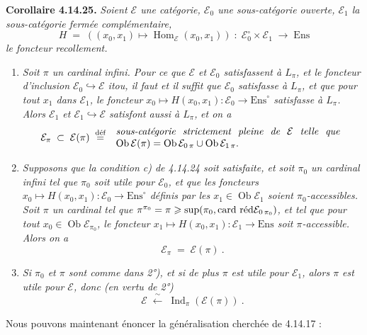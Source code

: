 \documentclass[11pt]{article}
\newcommand{\printedpage}[1]{\marginpar{\footnotesize p.~#1}}
\newcommand{\msp}[1]{\marginpar{\footnotesize [#1]}}
\newcommand{\cE}{\mathcal{E}}
\newcommand{\Ob}{\operatorname{Ob}}
\newcommand{\Hom}{\operatorname{Hom}}
\newcommand{\Ind}{\operatorname{Ind}}
\newcommand{\Ens}{\mathrm{Ens}}
\newcommand{\cardred}{\operatorname{card}\,\text{\upshape réd}}
\newcommand{\defeq}{\overset{\text{\upshape déf}}{=}}
\begin{document}
\textbf{Corollaire 4.14.25.} \textit{Soient $\cE$ une catégorie, $\cE_0$ une sous-catégorie ouverte, $\cE_1$ la sous-catégorie fermée complémentaire,}
\[
H \;=\; ((x_0,x_1) \longmapsto \Hom_{\cE}(x_0,x_1)) \;:\; \cE_0^\circ \times \cE_1 \;\longrightarrow\; \Ens
\]
\textit{le foncteur recollement.}
\begin{enumerate}
\item[\textit{1°)}] \textit{Soit $\pi$ un cardinal infini. Pour ce que $\cE$ et $\cE_0$ satisfassent à $L_\pi$, et le foncteur d'inclusion $\cE_0 \hookrightarrow \cE$ itou, il faut et il suffit que $\cE_0$ satisfasse à $L_\pi$, et que pour tout $x_1$ dans $\cE_1$, le foncteur $x_0 \longmapsto H(x_0,x_1) : \cE_0 \longrightarrow \Ens^\circ$ satisfasse à $L_\pi$. Alors $\cE_1$ et $\cE_1 \hookrightarrow \cE$ satisfont aussi à $L_\pi$,}
\msp{page 421}
\textit{et on a}
\[
\cE_\pi \;\subset\; \cE(\pi) \;\defeq\;
\begin{array}{l}
\text{\itshape sous-catégorie\ \ strictement\ \ pleine\ \ de\ \ $\cE$\ \ telle\ \ que}\\
\Ob\cE(\pi) = \Ob\cE_{0\,\pi} \cup \Ob\cE_{1\,\pi}.
\end{array}
\]
\item[\textit{2°)}] \textit{Supposons que la condition c) de 4.14.24 soit satisfaite, et soit $\pi_0$ un cardinal infini tel que $\pi_0$ soit utile pour $\cE_0$, et que les foncteurs $x_0 \longmapsto H(x_0,x_1) : \cE_0 \longrightarrow \Ens^\circ$ définis par les $x_1 \in \Ob\cE_1$ soient $\pi_0$-accessibles. Soit $\pi$ un cardinal tel que $\pi^{\pi_0} = \pi \geqslant \sup(\pi_0, \cardred\cE_{0\,\pi_0})$, et tel que pour tout $x_0 \in \Ob\cE_{\pi_0}$, le foncteur $x_1 \longmapsto H(x_0,x_1) : \cE_1 \longrightarrow \Ens$ soit $\pi$-accessible. Alors on a}
\[
\cE_\pi \;=\; \cE(\pi)\ .
\]

\printedpage{160}

\item[\textit{3°)}] \textit{Si $\pi_0$ et $\pi$ sont comme dans 2°), et si de plus $\pi$ est utile pour $\cE_1$, alors $\pi$ est utile pour $\cE$, donc (en vertu de 2°)}
\[
\cE \;\xleftarrow{\ \sim\ }\; \Ind_\pi(\cE(\pi))\ .
\]
\end{enumerate}
Nous pouvons maintenant énoncer la généralisation cherchée de 4.14.17 :
\end{document}
